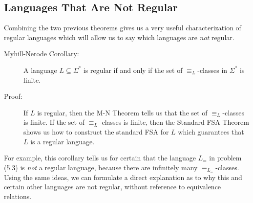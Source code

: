 \documentclass{article}
\begin{document}
\subsection{Languages That Are Not Regular} %


Combining the two previous theorems gives us a very useful characterization of regular languages which will allow us to say which languages are \emph{not} regular.

\begin{description}

\item[Myhill-Nerode Corollary:] A language $L \subseteq \Sigma^*$ is regular if and only if the set of $\equiv_L$-classes in $\Sigma^*$ is finite.

\item[Proof:] If $L$ is regular, then the M-N Theorem tells us that the set of $\equiv_L$-classes is finite. If the set of $\equiv_L$-classes is finite, then the Standard FSA Theorem shows us how to construct the standard FSA for $L$ which guarantees that $L$ is a regular language.

\end{description}

For example, this corollary tells us for certain that the language $L_=$ in problem (5.3) is \emph{not} a regular language, because there are infinitely many $\equiv_{L_=}$-classes. Using the same ideas, we can formulate a direct explanation as to why this and certain other languages are not regular, without reference to equivalence relations.
\end{document}
